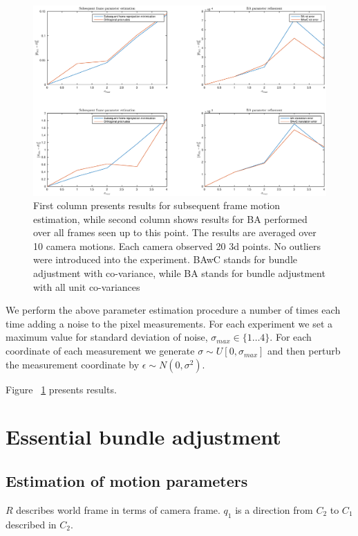 \documentclass[10pt]{article}         %
\begin{document}
\begin{figure}
  \centering
  \includegraphics[width=1\textwidth]{graphs}
  \caption{First column presents results for subsequent frame motion
    estimation, while second column shows results for BA performed
    over all frames seen up to this point.  The results are averaged
    over 10 camera motions.  Each camera observed 20 3d points.  No
    outliers were introduced into the experiment. BAwC stands for
    bundle adjustment with co-variance, while BA stands for bundle
    adjustment with all unit co-variances}
  \label{fig:graphs}
\end{figure}

We perform the above parameter estimation procedure a number of times
each time adding a noise to the pixel measurements. For each
experiment we set a maximum value for standard deviation of noise,
$\sigma_{max}\in \{1\dotsc 4\}$. For each coordinate of each
measurement we generate $\sigma \sim U[0,\sigma_{max}]$ and then
perturb the measurement coordinate by $\epsilon \sim N(0,\sigma^2)$.

Figure ~\ref{fig:graphs} presents results.

\section{Essential bundle adjustment}

\subsection{Estimation of motion parameters}
$R$ describes world frame in terms of camera frame. $q_1$ is a
direction from $C_2$ to $C_1$ described in $C_2$.
\end{document}
